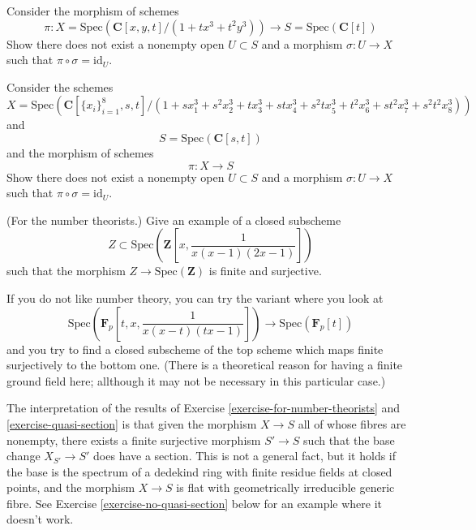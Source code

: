 \begin{exercise}
\label{exercise-no-section-curve}
Consider the morphism of schemes
$$
\pi :
X = \text{Spec}(\mathbf{C}[x, y, t]
/(1 + t x^3 + t^2 y^3))
\longrightarrow
S = \text{Spec}(\mathbf{C}[t])
$$
Show there does not exist a nonempty open $U \subset S$ and
a morphism $\sigma : U \to X$ such that $\pi \circ \sigma = \text{id}_U$.
\end{exercise}

\begin{exercise}
\label{exercise-no-section-surface}
Consider the schemes
$$
X = \text{Spec}(\mathbf{C}[\{x_i\}_{i = 1}^{8}, s, t]
/(1 + s x_1^3 + s^2 x_2^3 +
t x_3^3 + st x_4^3 + s^2t x_5^3 +
t^2 x_6^3 + st^2 x_7^3 + s^2t^2 x_8^3))
$$
and
$$
S = \text{Spec}(\mathbf{C}[s, t])
$$
and the morphism of schemes
$$
\pi : X \longrightarrow S
$$
Show there does not exist a nonempty open $U \subset S$ and
a morphism $\sigma : U \to X$ such that $\pi \circ \sigma = \text{id}_U$.
\end{exercise}

\begin{exercise}
\label{exercise-for-number-theorists}
(For the number theorists.) Give an example of a closed subscheme
$$
Z \subset \text{Spec}\left({\mathbf Z}[x, \frac{1 }{ x(x-1)(2x-1)}]\right)
$$
such that the morphism $Z \to \text{Spec}({\mathbf Z})$ is finite
and surjective.
\end{exercise}

\begin{exercise}
\label{exercise-quasi-section}
If you do not like number theory, you can try the
variant where you look at
$$
\text{Spec}\left({\mathbf F}_p[t, x, \frac{1 }{ x(x-t)(tx-1)}]\right)
\longrightarrow
\text{Spec}({\mathbf F}_p[t])
$$
and you try to find a closed subscheme of the top scheme
which maps finite surjectively to the bottom one. (There is a
theoretical reason for having a finite ground field here; allthough
it may not be necessary in this particular case.)
\end{exercise}

\begin{remark}
\label{remark-interpretation-skolem-noether}
The interpretation of the results of
Exercise \ref{exercise-for-number-theorists} and \ref{exercise-quasi-section}
is that given the morphism $X \to S$ all of whose fibres are nonempty,
there exists a finite surjective morphism $S' \to S$ such that
the base change $X_{S'} \to S'$ does have a section.
This is not a general fact, but it holds if the base is the spectrum of a
dedekind ring with finite residue fields at closed points, and
the morphism $X \to S$ is flat with geometrically irreducible generic
fibre. See Exercise \ref{exercise-no-quasi-section} below for an example
where it doesn't work.
\end{remark}

